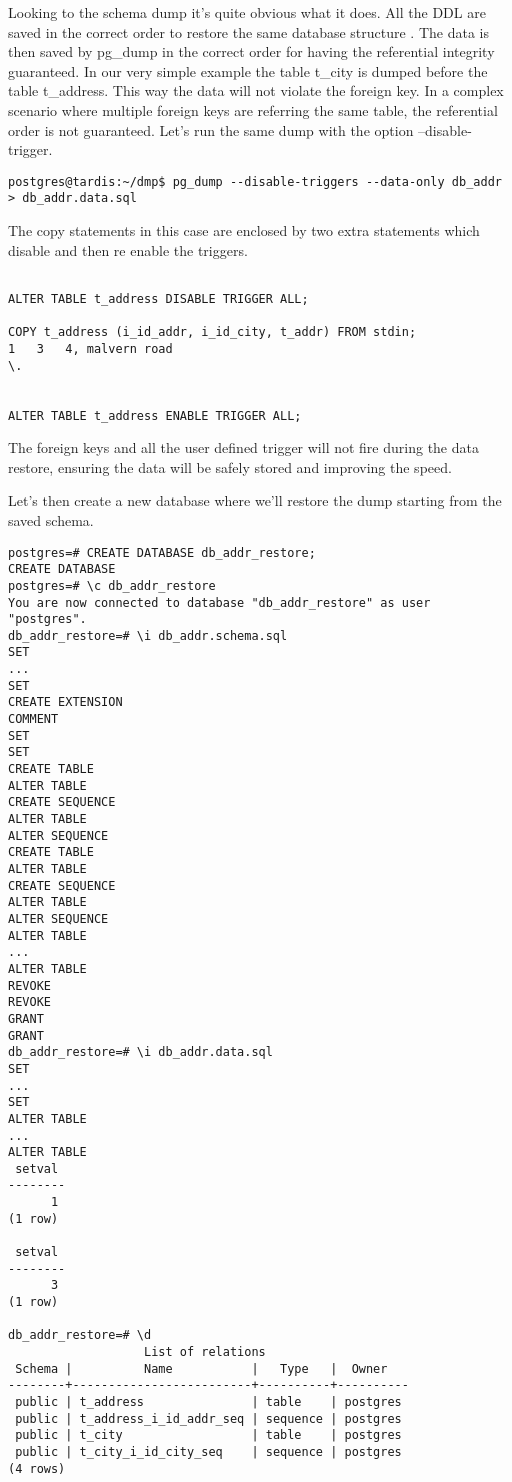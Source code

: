 Looking to the schema dump it's quite obvious what it does. All the DDL are saved in the correct
order to restore the same database structure .\newline
The data is then saved by pg\_dump in the correct order for having the referential integrity
guaranteed. In our very simple example the table t\_city is dumped before the table t\_address.
This way the data will not violate the foreign key. In a complex scenario where multiple foreign keys are
referring the same table, the referential order is not guaranteed. Let's run the same
dump with the option --disable-trigger.

\begin{verbatim}
postgres@tardis:~/dmp$ pg_dump --disable-triggers --data-only db_addr > db_addr.data.sql

\end{verbatim}

The copy statements in this case are enclosed by two extra statements which disable and then re enable the
triggers.

\begin{lstlisting}[style=pgsql]

ALTER TABLE t_address DISABLE TRIGGER ALL;

COPY t_address (i_id_addr, i_id_city, t_addr) FROM stdin;
1	3	4, malvern road
\.


ALTER TABLE t_address ENABLE TRIGGER ALL;

\end{lstlisting}

The foreign keys and all the user defined trigger will not fire during the data restore, ensuring
the data will be safely stored and improving the speed.\newline

Let's then create a new database where we'll restore the dump starting from the saved schema.

\begin{lstlisting}[style=pgsql]
postgres=# CREATE DATABASE db_addr_restore;
CREATE DATABASE
postgres=# \c db_addr_restore
You are now connected to database "db_addr_restore" as user "postgres".
db_addr_restore=# \i db_addr.schema.sql
SET
...
SET
CREATE EXTENSION
COMMENT
SET
SET
CREATE TABLE
ALTER TABLE
CREATE SEQUENCE
ALTER TABLE
ALTER SEQUENCE
CREATE TABLE
ALTER TABLE
CREATE SEQUENCE
ALTER TABLE
ALTER SEQUENCE
ALTER TABLE
...
ALTER TABLE
REVOKE
REVOKE
GRANT
GRANT
db_addr_restore=# \i db_addr.data.sql
SET
...
SET
ALTER TABLE
...
ALTER TABLE
 setval
--------
      1
(1 row)

 setval
--------
      3
(1 row)

db_addr_restore=# \d
                   List of relations
 Schema |          Name           |   Type   |  Owner
--------+-------------------------+----------+----------
 public | t_address               | table    | postgres
 public | t_address_i_id_addr_seq | sequence | postgres
 public | t_city                  | table    | postgres
 public | t_city_i_id_city_seq    | sequence | postgres
(4 rows)

\end{lstlisting}



